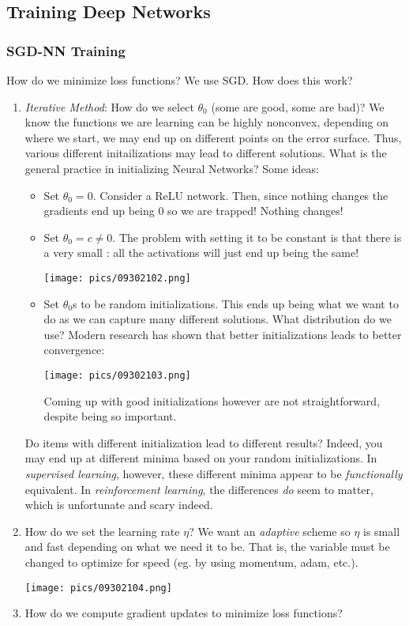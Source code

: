 \documentclass[11pt]{scrartcl}
\begin{document}
\subsection{Training Deep Networks}
\subsubsection{SGD-NN Training}
How do we minimize loss functions? We use SGD. How does this work? 
\begin{enumerate}
    \item \textit{Iterative Method}: How do we select $\theta_0$ (some are good, some are bad)? We know the functions we are learning can be highly nonconvex, depending on where we start, we may end up on different points on the error surface. Thus, various different initailizations may lead to different solutions. What is the general practice in initializing Neural Networks? Some ideas:
    \begin{itemize}
        \item Set $\theta_0=0$. Consider a ReLU network. Then, since nothing changes the gradients end up being $0$ so we are trapped! Nothing changes!
        \item Set $\theta_0 = c \ne 0$. The problem with setting it to be constant is that there is a very small : all the activations will just end up being the same!
        \begin{center}
            \texttt{[image: pics/09302102.png]}
        \end{center}
        \item Set $\theta_0$s to be random initializations. This ends up being what we want to do as we can capture many different solutions. What distribution do we use? Modern research has shown that better initializations leads to better convergence:
        \begin{center}
            \texttt{[image: pics/09302103.png]}
        \end{center}
        Coming up with good initializations however are not straightforward, despite being so important. 
    \end{itemize}
    Do items with different initialization lead to different results? Indeed, you may end up at different minima based on your random initializations. In \textit{supervised learning}, however, these different minima appear to be \textit{functionally} equivalent. In \textit{reinforcement learning}, the differences \textit{do} seem to matter, which is unfortunate and scary indeed. 
    \item How do we set the learning rate $\eta$? We want an \textit{adaptive} scheme so $\eta$ is small and fast depending on what we need it to be. That is, the variable must be changed to optimize for speed (eg. by using momentum, adam, etc.). 
    \begin{center}
        \texttt{[image: pics/09302104.png]}
    \end{center}
    \item How do we compute gradient updates to minimize loss functions?  
    
\end{enumerate}
\end{document}
